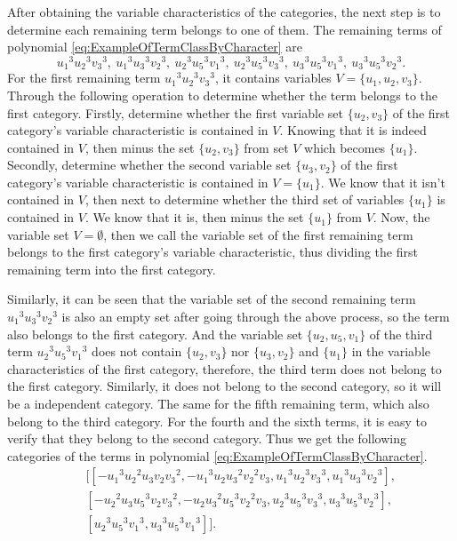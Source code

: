 \documentclass[10pt,a4paper]{article}
\begin{document}
After obtaining the variable characteristics of the categories, the next step is to determine each remaining term belongs to one of them. The remaining terms of polynomial \eqref{eq:ExampleOfTermClassByCharacter} are
\begin{equation*}
  {u_{{1}}}^{3}{u_{{2}}}^{3}{v_{{3}}}^{3},\ {u_{{1}}}^{3}{u_{{3}}}^{3}{v_{{2}}}^{3},\ {u_{{2}}}^{3}{u_{{5}}}^{3}{v_{{1}}}^{3},\ {u_{{2}}}^{3}{u_{{5}}}^{3}{v_{{3}}}^{3},\  {u_{{3}}}^{3}{u_{{5}}}^{3}{v_{{1}}}^{3},\ {u_{{3}}}^{3}{u_{{5}}}^{3}{v_{{2}}}^{3}.
\end{equation*}
For the first remaining term ${u_{{1}}}^{3}{u_{{2}}}^{3}{v_{{3}}}^{3}$, it contains variables $V = \{u_1, u_2, v_3\}$. Through the following operation to determine whether the term belongs to the first category. Firstly, determine whether the first variable set $\{u_2, v_3\}$ of the first category's variable characteristic is contained in $V$. Knowing that it is indeed contained in $V$, then minus the set $\{u_2, v_3\}$ from set $V$ which becomes $\{u_1\}$. Secondly, determine whether the second variable set $\{u_3, v_2\}$ of the first category's variable characteristic is contained in $V=\{u_1\}$. We know that it isn't contained in $V$, then next to determine whether the third set of variables $\{u_1\}$ is contained in $V$. We know that it is, then minus the set $\{u_1\}$ from $V$. Now, the variable set $V = \emptyset$, then we call the variable set of the first remaining term belongs to the first category's variable characteristic, thus dividing the first remaining term into the first category.

Similarly, it can be seen that the variable set of the second remaining term ${u_{{1}}}^{3}{u_{{3}}}^{3}{v_{{2}}}^{3}$ is also an empty set after going through the above process, so the term also belongs to the first category. And the variable set $\{u_2, u_5, v_1\}$ of the third term ${u_{{2}}}^{3}{u_{{5}}}^{3}{v_{{1}}}^{3}$ does not contain $\{u_2, v_3\}$ nor $\{u_3, v_2\}$ and $\{u_1\}$ in the variable characteristics of the first category, therefore, the third term does not belong to the first category. Similarly, it does not belong to the second category, so it will be a independent category. The same for the fifth remaining term, which also belong to the third category. For the fourth and the sixth terms, it is easy to verify that they belong to the second category. Thus we get the following categories of the terms in polynomial \eqref{eq:ExampleOfTermClassByCharacter}.
\begin{eqnarray*}
  && [[-{u_{{1}}}^{3}{u_{{2}}}^{2}u_{{3}}v_{{2}}{v_{{3}}}^{2}, -{u_{{1}}}^{3}u_{{2}}{u_{{3}}}^{2}{v_{{2}}}^{2}v_{{3}}, {u_{{1}}}^{3}{u_{{2}}}^{3}{v_{{3}}}^{3}, {u_{{1}}}^{3}{u_{{3}}}^{3}{v_{{2}}}^{3}],\\
  && [-{u_{{2}}}^{2}u_{{3}}{u_{{5}}}^{3}v_{{2}}{v_{{3}}}^{2}, -u_{{2}}{u_{{3}}}^{2}{u_{{5}}}^{3}{v_{{2}}}^{2}v_{{3}}, {u_{{2}}}^{3}{u_{{5}}}^{3}{v_{{3}}}^{3}, {u_{{3}}}^{3}{u_{{5}}}^{3}{v_{{2}}}^{3}],\\
  && [{u_{{2}}}^{3}{u_{{5}}}^{3}{v_{{1}}}^{3}, {u_{{3}}}^{3}{u_{{5}}}^{3}{v_{{1}}}^{3}]].
\end{eqnarray*}
\end{document}
